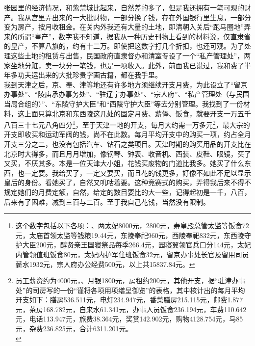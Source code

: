 张园里的经济情况，和紫禁城比起来，自然差的多了，但是我还拥有一笔可观的财产。我从宫里弄出来的一大批财物，一部分换了钱，存在外国银行里生息，一部分变为房产，按月收租金。在关内外我还有大量的土地，即清朝入关后“跑马圈地”弄来的所谓“皇产”，数字我不知道，据我从一种历史刊物上看到的材料说，仅直隶省的皇产，不算八旗的，约有十二万。即使把这数字打几个折扣，也还可观。为了处理这些土地的租赁与出售，民国政府直隶督办和清室专设了一个“私产管理处”，两家坐地分赃，卖一块分一笔钱，也是一项收入。此外，前面我已说过，我和费了半年多功夫运出来的大批珍贵字画古籍，都在我手里。\\

我到天津之后，京、奉、津等地还有许多地方须继续开支月费，为此设立了“留京办事处”、“陵庙承办事务处”、“驻辽宁办事处”、“宗人府”、“私产管理处（与民国当局合组的）”、“东陵守护大臣”和“西陵守护大臣”等去分别管理。我找到了一份材料，这上面只算北京和东西陵这几处的固定月费、薪俸、饭食，就要开支一万五千八百三十七元八角四分\footnote{这个数字包括以下各项：、两太妃8000元，2800元，寿皇殿总管太监等饭食72元，太庙首领太监等钱粮19.44元，东陵奉祀960元，西陵奉祀832元，东西陵守护大臣200元，醇贤亲王国寝祭品每季266.4元，园寝翼领官兵口分144元，太妃内管领值班饭食80元，太妃内护军住班饭食32元，留京办事处长官及留用司员薪水1932元，宗人府办公经费500元，以上共15837.84元。}，至于天津一地的开支，每月大约需一万多元\footnote{员工薪资约为4000元，、月银1800元，房租约200元，其他开支，据“驻津办事处”的司房写的一份“谨将各项用项缮呈御览”的表格，其中核计出的每月平均开支如下：膳房536.511元，电灯234.947元，番菜膳房215.115元，邮费1.877元，茶房168.782元，自来水61.341元，办事人员饭食236.194元，车费110.642元，电话113.947元，旅费38.364元，奖赏142.902元，购物4128.754元，马85元，杂费236.825元，合计6311.201元。\\}，最大宗的开支即收买和运动军阀的钱，尚不在此数。每月平均开支中的购买一项，约占全月开支三分之二，也没有包括汽车、钻石之类项目。天津时期的购买用品的开支比在北京时大得多，而且月月增加，像钢琴、钟表、收音机、西装、皮鞋、眼镜，买了又买，不厌其多。本是一位天津大小姐，花钱买废物的门道比我多。她买了什么东西，也一定要。我给买了，一定又要买，而且花的钱更多，好像不如此不足以显示皇后的身份。看她买了，自然又叽咕着要。这种竞赛式的购买，弄得我后来不得不规定她们的月费定额，自然，给定的数目要比的大一些，记得起初是一千，八百，后来有了困难，减到三百与二百。至于我自己花钱，当然没有限制。\\

